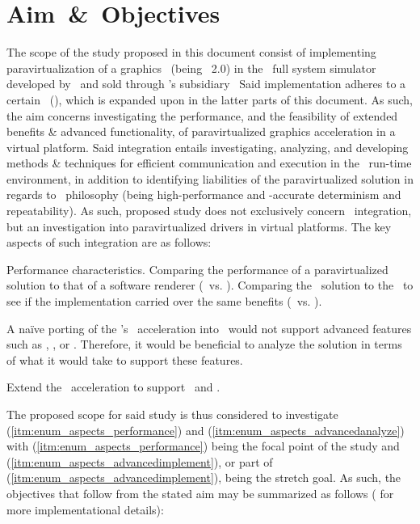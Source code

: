 
\chapter{Aim~\&~Objectives}
\label{cha:aimandobjectives}
The scope of the study proposed in this document consist of implementing paravirtualization of a graphics \termapi\ (being \termopengles ~2.0) in the \termsimics\ full system simulator developed by \termintel\ and sold through \termintel 's subsidiary \termwindriver\
Said implementation adheres to a certain \termrefimpl\ (), which is expanded upon in the latter parts of this document.
As such, the aim concerns investigating the performance, and the feasibility of extended benefits \& advanced functionality, of paravirtualized graphics acceleration in a virtual platform.
Said integration entails investigating, analyzing, and developing methods \& techniques for efficient communication and execution in the \termsimics\ run-time environment, in addition to identifying liabilities of the paravirtualized solution in regards to \termsimics\ philosophy (being high-performance and \termtiming -accurate determinism and repeatability).
As such, proposed study does not exclusively concern \termsimics\ integration, but an investigation into paravirtualized drivers in virtual platforms.
The key aspects of such integration are as follows:
\begin{enumerate*}
	\item \label{itm:enum_aspects_performance} Performance characteristics.
	Comparing the performance of a paravirtualized solution to that of a software renderer (\termsimics\ vs. \termsimics ).
	Comparing the \termsimics\ solution to the \termrefsolu\ to see if the implementation carried over the same benefits (\termsimics\ vs. \termrefsolu ).
	\item \label{itm:enum_aspects_advancedanalyze} A naïve porting of the \termrefimpl 's \termopengles\ acceleration into \termsimics\ would not support advanced features such as \termdetexe , \termcheckpointing , or \termrevexe .
	Therefore, it would be beneficial to analyze the solution in terms of what it would take to support these features.
	\item \label{itm:enum_aspects_advancedimplement} Extend the \termopengles\ acceleration to support \termcheckpointing\ and \termrevexe .
\end{enumerate*}
The proposed scope for said study is thus considered to investigate (\ref{itm:enum_aspects_performance}) and (\ref{itm:enum_aspects_advancedanalyze}) with (\ref{itm:enum_aspects_performance}) being the focal point of the study and (\ref{itm:enum_aspects_advancedimplement}), or part of (\ref{itm:enum_aspects_advancedimplement}), being the stretch goal.
As such, the objectives that follow from the stated aim may be summarized as follows (\dvcmdrefsee{\dvcmdrefcha{cha:researchmethodology}} for more implementational details):

